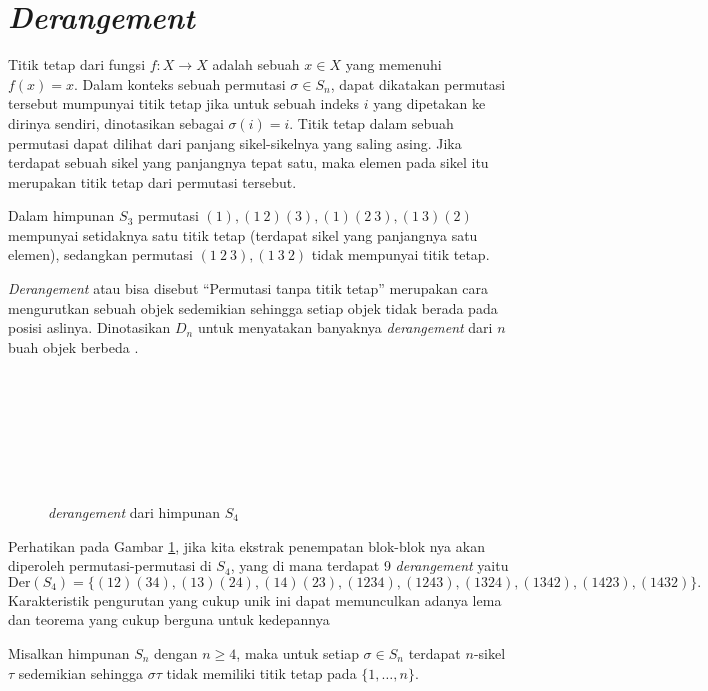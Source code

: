 \section{\textit{Derangement}}
Titik tetap dari fungsi $f: X\to X$ adalah sebuah $x\in X$ yang memenuhi $f(x)=x$. Dalam konteks sebuah permutasi
$\sigma\in S_n$, dapat dikatakan permutasi tersebut mumpunyai titik tetap jika untuk sebuah indeks $i$ yang dipetakan
ke dirinya sendiri, dinotasikan sebagai $\sigma(i)=i$. Titik tetap dalam sebuah permutasi dapat dilihat dari panjang
sikel-sikelnya yang saling asing. Jika terdapat sebuah sikel yang panjangnya tepat satu, maka elemen pada sikel itu
merupakan titik tetap dari permutasi tersebut.
\begin{contoh}
  Dalam himpunan $S_3$ permutasi $(1), (1\ 2)(3), (1)(2\ 3), (1\ 3)(2)$ mempunyai setidaknya satu titik tetap (terdapat sikel yang panjangnya satu elemen), sedangkan
  permutasi $(1\ 2\ 3), (1\ 3\ 2)$ tidak mempunyai titik tetap.
\end{contoh}
\textit{Derangement} atau bisa disebut ``Permutasi tanpa titik tetap'' merupakan cara mengurutkan sebuah objek sedemikian
sehingga setiap objek tidak berada pada posisi aslinya. Dinotasikan $D_n$ untuk menyatakan banyaknya \textit{derangement}
dari $n$ buah objek berbeda \parencite{george2017introductioncombinatorics}.
\begin{figure}[H]
  \centering
  \quad{}\quad{}\quad{}\\
  \quad{}\quad{}\quad{}\\
  \quad{}\quad{}\quad{}\\
  \quad{}\quad{}\quad{}\\
  \quad{}\quad{}\quad{}\\
  \quad{}\quad{}\quad{}\\
  \caption{\emph{derangement} dari himpunan $S_4$}
  \label{fig:derangement_s4}
\end{figure}
Perhatikan pada Gambar \ref{fig:derangement_s4}, jika kita ekstrak penempatan blok-blok nya akan diperoleh permutasi-permutasi di $S_4$, yang di mana terdapat 9 \emph{derangement} yaitu
\[
  \mathrm{Der}(S_4)
  =\{
  (12)(34),(13)(24),(14)(23),
  (1234),(1243),(1324),
  (1342),(1423),(1432)\}.
\]
Karakteristik pengurutan yang cukup unik ini dapat memunculkan adanya lema dan teorema
yang cukup berguna untuk kedepannya
\begin{lema}
  Misalkan himpunan $S_n$ dengan $n\geq 4$, maka untuk setiap $\sigma\in S_n$ terdapat $n$-sikel $\tau$ sedemikian sehingga $\sigma\tau$ tidak memiliki titik tetap pada $\{1,\dots,n\}$.
\end{lema}
